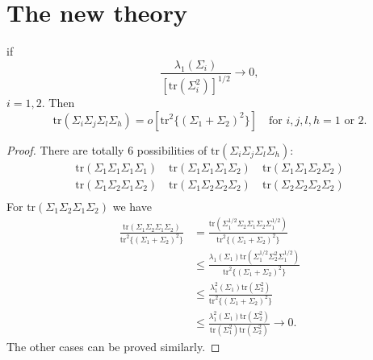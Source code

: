 \section{The new theory}
\begin{lemma}
    if 
    \begin{equation}
        \frac{\lambda_1(\Sigma_i)}{{[\mathrm{tr}(\Sigma_i^2)]}^{1/2}}\to 0,
    \end{equation}
    $i=1,2$. Then
    \begin{equation}
        \mathrm{tr}(\Sigma_i\Sigma_j\Sigma_l\Sigma_h)=o[\mathrm{tr}^2 \{{(\Sigma_1+\Sigma_2)}^2\}]\quad \textrm{for} \,\, i,j,l,h=1\,\,\textrm{or}\,\, 2.
    \end{equation}
\end{lemma}
\begin{proof}
    There are totally $6$ possibilities of 
    $\mathrm{tr}(\Sigma_i\Sigma_j\Sigma_l\Sigma_h)$:
    \begin{equation*}
        \begin{aligned}
    \mathrm{tr}(\Sigma_1\Sigma_1\Sigma_1\Sigma_1)\quad
    \mathrm{tr}(\Sigma_1\Sigma_1\Sigma_1\Sigma_2)\quad
    \mathrm{tr}(\Sigma_1\Sigma_1\Sigma_2\Sigma_2)\\
    \mathrm{tr}(\Sigma_1\Sigma_2\Sigma_1\Sigma_2)\quad
    \mathrm{tr}(\Sigma_1\Sigma_2\Sigma_2\Sigma_2)\quad
    \mathrm{tr}(\Sigma_2\Sigma_2\Sigma_2\Sigma_2)\\
        \end{aligned}
    \end{equation*}
    For $\mathrm{tr}(\Sigma_1\Sigma_2\Sigma_1\Sigma_2)$ we have
    \begin{equation*}
        \begin{aligned}
            \frac{\mathrm{tr}(\Sigma_1\Sigma_2\Sigma_1\Sigma_2)}{\mathrm{tr}^2 \{{(\Sigma_1+\Sigma_2)}^2\}}&=
            \frac{\mathrm{tr}(\Sigma_1^{1/2}\Sigma_2\Sigma_1\Sigma_2\Sigma_1^{1/2})}{\mathrm{tr}^2 \{{(\Sigma_1+\Sigma_2)}^2\}}\\
            &\leq
            \frac{\lambda_1(\Sigma_1)\mathrm{tr}(\Sigma_1^{1/2}\Sigma_2^2\Sigma_1^{1/2})}{\mathrm{tr}^2 \{{(\Sigma_1+\Sigma_2)}^2\}}\\
            &\leq
            \frac{\lambda_1^2(\Sigma_1)\mathrm{tr}(\Sigma_2^2)}{\mathrm{tr}^2 \{{(\Sigma_1+\Sigma_2)}^2\}}\\
            &\leq
            \frac{\lambda_1^2(\Sigma_1)\mathrm{tr}(\Sigma_2^2)}{\mathrm{tr} (\Sigma_1^2)\mathrm{tr} (\Sigma_2^2)}\to 0.
        \end{aligned}
    \end{equation*}
    The other cases can be proved similarly.
\end{proof}
